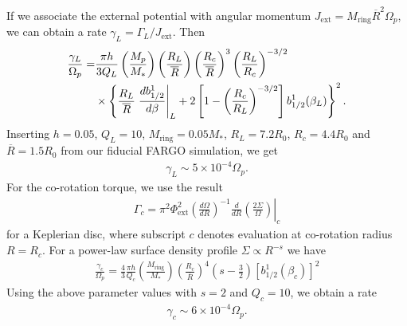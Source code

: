 If we associate the external potential with angular momentum 
$J_\mathrm{ext}  = M_\mathrm{ring}\overline{R}^2\Omega_p$, we can obtain a
rate $\gamma_L=\Gamma_L/J_\mathrm{ext}$. Then 
\begin{align}
  \frac{\gamma_L}{\Omega_p} = &\frac{\pi
    h}{3Q_L}\left(\frac{M_p}{M_*}\right)\left(\frac{R_L}{\overline{R}}\right)\left(\frac{R_c}{\overline{R}}\right)^3\left(\frac{R_L}{R_c}\right)^{-3/2}\notag\\
  &\times \left\{\frac{R_L}{\overline{R}}\left.\frac{db_{1/2}^1}{d\beta}\right|_L + 2\left[1 -
      \left(\frac{R_c}{R_L}\right)^{-3/2}\right]b_{1/2}^1(\beta_L)\right\}^2.
\end{align}
Inserting $h=0.05$, $Q_L=10$, $M_\mathrm{ring} = 0.05M_*$,
$R_L=7.2R_0$, $R_c=4.4R_0$ and $\overline{R}=1.5R_0$ from our fiducial
FARGO simulation, we get
\begin{align}
  \gamma_L \sim 5\times10^{-4}\Omega_p. 
\end{align}
For the co-rotation torque, we use the result
\begin{align}
  \Gamma_c = \left.
    \pi^2\Phi_\mathrm{ext}^2\left(\frac{d\Omega}{dR}\right)^{-1}\frac{d}{dR}\left(\frac{2\Sigma}{\Omega}\right)\right|_{c}   
\end{align}
for a Keplerian disc, where subscript $c$ denotes evaluation at
co-rotation radius $R=R_c$. For a power-law surface density profile
$\Sigma\propto R^{-s}$ we have
\begin{align}
\frac{\gamma_c}{\Omega_p} = \frac{4}{3}\frac{\pi h}{Q_c}
\left(\frac{M_\mathrm{ring}}{M_*}\right)\left(\frac{R_c}{\overline{R}}\right)^4\left(s-\frac{3}{2}\right)
\left[b_{1/2}^1(\beta_c)\right]^2   
\end{align}
Using the above parameter values with $s=2$ and $Q_c=10$, we obtain a
rate
\begin{align}
  \gamma_c\sim 6\times 10^{-4}\Omega_p. 
\end{align}

